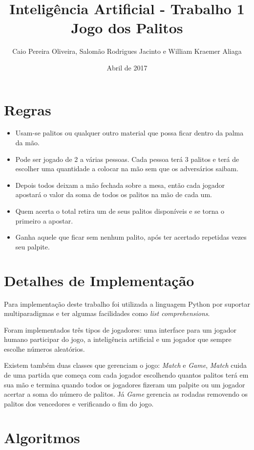 \documentclass{article}
\title{Inteligência Artificial - Trabalho 1\\Jogo dos Palitos}
\author{Caio Pereira Oliveira, Salomão Rodrigues Jacinto e William Kraemer Aliaga}
\date{Abril de 2017}
\begin{document}
\maketitle

\section{Regras}

\begin{itemize}

\item Usam-se palitos ou qualquer outro material que possa ficar dentro da palma da mão.
\item Pode ser jogado de 2 a várias pessoas. Cada pessoa terá 3 palitos e terá de escolher uma quantidade a colocar na mão sem que os adversários saibam.
\item Depois todos deixam a mão fechada sobre a mesa, então cada jogador apostará o valor da soma de todos os palitos na mão de cada um.
\item Quem acerta o total retira um de seus palitos disponíveis e se torna o primeiro a apostar.
\item Ganha aquele que ficar sem nenhum palito, após ter acertado repetidas vezes seu palpite.

\end{itemize}

\section{Detalhes de Implementação}

Para implementação deste trabalho foi utilizada a linguagem Python por suportar multiparadigmas e ter algumas facilidades como \textit{list comprehensions}.

Foram implementados três tipos de jogadores: uma interface para um jogador humano participar do jogo, a inteligência artificial e um jogador que sempre escolhe números aleatórios.

Existem também duas classes que gerenciam o jogo: \emph{Match} e \emph{Game}, \emph{Match} cuida de uma partida que começa com cada jogador escolhendo quantos palitos terá em sua mão e termina quando todos os jogadores fizeram um palpite ou um jogador acertar a soma do número de palitos. Já \emph{Game} gerencia as rodadas removendo os palitos dos vencedores e verificando o fim do jogo.


\section{Algoritmos}
\end{document}
